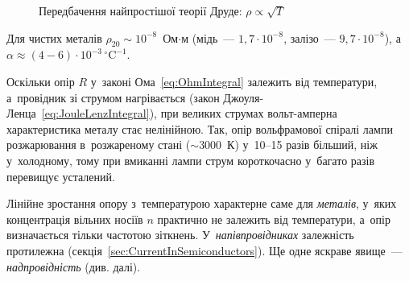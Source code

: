 \begin{figure}
	\centering
	\centering
	\caption{Передбачення найпростішої теорії Друде: $\rho\propto\sqrt T$}
	\label{pic:DrudeRho}
\end{figure}

Для чистих металів $\rho_{20}\sim10^{-8}$~Ом$\cdot$м (мідь~--- $1{,}7\cdot10^{-8}$,
залізо~--- $9{,}7\cdot10^{-8}$),
а~$\alpha\approx(4 - 6)\cdot10^{-3}\,{}^\circ\text{C}^{-1}$.

Оскільки опір $R$ у~законі Ома~\eqref{eq:OhmIntegral} залежить від температури,
а~провідник зі струмом нагрівається (закон Джоуля-Ленца~\eqref{eq:JouleLenzIntegral}), при
великих струмах вольт-амперна характеристика металу стає нелінійною. Так, опір
вольфрамової спіралі лампи розжарювання в~розжареному стані ($\sim3000$~К) у~10--15 разів
більший, ніж у~холодному, тому при вмиканні лампи струм короткочасно у~багато разів
перевищує усталений.

\begin{Attention}
	Лінійне зростання опору з~температурою характерне саме для \emph{металів}, у~яких
	концентрація вільних носіїв $n$ практично не залежить від температури, а~опір
	визначається тільки частотою зіткнень. У~\emph{напівпровідниках} залежність
	протилежна (секція~\ref{sec:CurrentInSemiconductors}). Ще одне яскраве явище~---
	\emph{надпровідність} (див. далі).
\end{Attention}


